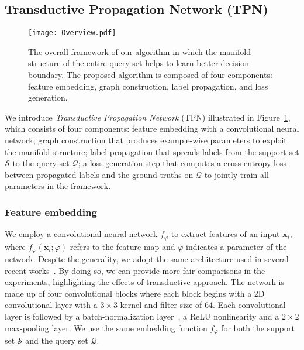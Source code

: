 \documentclass{article} \usepackage{iclr2019_conference,times}
\def\bfx{\mathbf{x}}
\begin{document}
\subsection{Transductive Propagation Network (TPN)}

\begin{figure}[t]
  \centering
  \texttt{[image: Overview.pdf]}
  \small
  \caption{The overall framework of our algorithm in which the manifold structure of the entire query set helps to learn better decision boundary. The proposed algorithm is composed of four components: feature embedding, graph construction, label propagation, and loss generation.}
  \label{transduction}
\end{figure}

We introduce \textit{Transductive Propagation Network} (TPN) illustrated  
in Figure~\ref{transduction}, which consists of four components: 
feature embedding with a convolutional neural network; 
graph construction that produces example-wise parameters to exploit the manifold structure;
label propagation that spreads labels from the support set $\mathcal{S}$ to the query set $\mathcal{Q}$; a loss generation step that computes a cross-entropy loss between propagated labels and the ground-truths on $\mathcal{Q}$ to jointly train all parameters in
the framework.





\subsubsection{Feature embedding}
\label{embedding}

We employ a convolutional neural network $f_{\varphi}$ to extract features of an input $\bfx_i$,
where $f_{\varphi}(\bfx_i; \varphi)$ refers to the feature map and $\varphi$ indicates a parameter
of the network. Despite the generality, we adopt the same architecture used in several recent works~\citep{prototypical,compare,matching}. By doing so, we can provide more fair comparisons in the experiments, highlighting the effects of transductive approach.
The network is made up of four convolutional blocks where each block begins with a 2D convolutional layer with a $3\times 3$ kernel and filter size of $64$. Each convolutional layer is followed by a batch-normalization layer~\citep{bn}, a ReLU nonlinearity and a $2\times 2$ max-pooling layer. We use the same embedding function $f_{\varphi}$ for both the support set $\mathcal{S}$ and the query set $\mathcal{Q}$.
\end{document}
